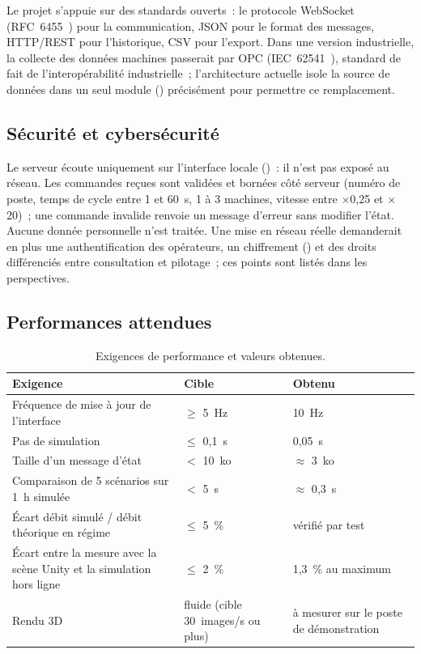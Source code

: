 Le projet s'appuie sur des standards ouverts~: le protocole WebSocket (RFC~6455~\cite{rfc6455}) pour la communication, \ac{JSON} pour le format des messages, HTTP/\ac{REST} pour l'historique, \ac{CSV} pour l'export. Dans une version industrielle, la collecte des données machines passerait par \ac{OPC} (IEC~62541~\cite{opcua}), standard de fait de l'interopérabilité industrielle~; l'architecture actuelle isole la source de données dans un seul module () précisément pour permettre ce remplacement.

\subsection{Sécurité et cybersécurité}

Le serveur écoute uniquement sur l'interface locale ()~: il n'est pas exposé au réseau. Les commandes reçues sont validées et bornées côté serveur (numéro de poste, temps de cycle entre 1 et 60~s, 1 à 3 machines, vitesse entre $\times$0{,}25 et $\times$20)~; une commande invalide renvoie un message d'erreur sans modifier l'état. Aucune donnée personnelle n'est traitée. Une mise en réseau réelle demanderait en plus une authentification des opérateurs, un chiffrement () et des droits différenciés entre consultation et pilotage~; ces points sont listés dans les perspectives.

\subsection{Performances attendues}

\begin{table}[H]
\centering
\caption{Exigences de performance et valeurs obtenues.}
\label{tab:perf}
\begin{tabularx}{\textwidth}{@{}X p{3.1cm} p{3.6cm}@{}}
\toprule
\textbf{Exigence} & \textbf{Cible} & \textbf{Obtenu} \\
\midrule
Fréquence de mise à jour de l'interface & $\geq$ 5~Hz & 10~Hz \\
Pas de simulation & $\leq$ 0{,}1~s & 0{,}05~s \\
Taille d'un message d'état & $<$ 10~ko & $\approx$ 3~ko \\
Comparaison de 5 scénarios sur 1~h simulée & $<$ 5~s & $\approx$ 0{,}3~s \\
Écart débit simulé / débit théorique en régime & $\leq$ 5~\% & vérifié par test \\
Écart entre la mesure avec la scène Unity et la simulation hors ligne & $\leq$ 2~\% & 1{,}3~\% au maximum \\
Rendu \ac{3D} & fluide (cible 30~images/s ou plus) & à mesurer sur le poste de démonstration \\
\bottomrule
\end{tabularx}
\end{table}
